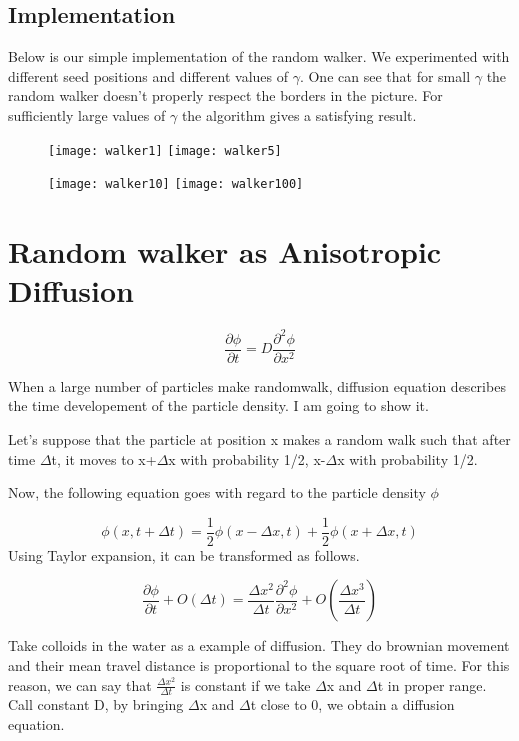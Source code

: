 \documentclass[12pt,a4paper]{scrartcl}
\begin{document}
\subsection{Implementation}

Below is our simple implementation of the random walker. We experimented with different seed positions and different values of $\gamma$. One can see that for small $\gamma$ the random walker doesn't properly respect the borders in the picture. For sufficiently large values of $\gamma$ the algorithm gives a satisfying result.

\begin{figure}
  \centering
  \texttt{[image: walker1]}
  \texttt{[image: walker5]}
\end{figure}

\begin{figure}
  \texttt{[image: walker10]}
  \texttt{[image: walker100]}
\end{figure}

\clearpage


\section{Random walker as Anisotropic Diffusion}
\[
\frac{\partial \phi}{\partial t} = D \frac{\partial^{2} \phi}{\partial x^{2}}
\]

When a large number of particles make randomwalk, diffusion equation describes the time developement of the particle density. I am going to show it.

Let's suppose that the particle at position x makes a random walk such that after time \(\Delta\)t, it moves to x+\(\Delta\)x with probability 1/2, x-\(\Delta\)x with probability 1/2.

Now, the following equation goes with regard to the particle density \(\phi\)

\[
\phi (x,t+\Delta t) = \frac{1}{2}\phi (x-\Delta x,t) + \frac{1}{2}\phi (x+\Delta x,t)
\]
Using Taylor expansion, it can be transformed as follows.

\[
\frac{\partial \phi}{\partial t} + O(\Delta t) = \frac{\Delta x^{2}}{\Delta t} \frac{\partial^{2} \phi}{\partial x^{2}} + O(\frac{\Delta x^{3}}{\Delta t})
\]

Take colloids in the water as a example of diffusion. They do brownian movement and their mean travel distance is proportional to the square root of time. For this reason, we can say that \(\frac{\Delta x^{2}}{\Delta t}\) is constant if we take \(\Delta\)x and \(\Delta\)t in proper range. Call constant D, by bringing \(\Delta\)x and \(\Delta\)t close to 0, we obtain a diffusion equation.
\end{document}

